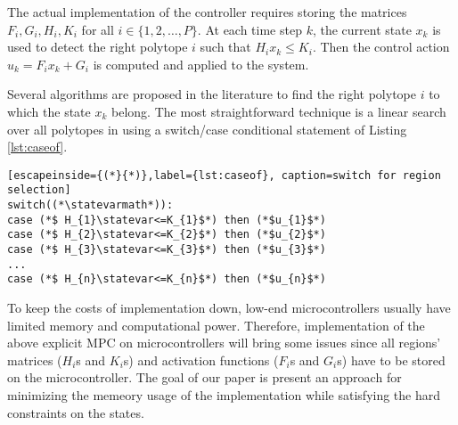 The actual implementation of the controller requires storing the matrices $F_i,G_i,H_i,K_i$ for all $i\in\{1,2,\ldots,P\}$. At each time step $k$, the current state $x_k$ is used to detect the right polytope $i$ such that $H_i x_k\le K_i$. Then the control action $u_k = F_i x_k + G_i$ is computed and applied to the system.

Several algorithms are proposed in the literature \Sadegh{[references?]} to find the right polytope $i$ to which the state $x_k$ belong. The most straightforward technique is a linear search over all polytopes in \Sadegh{\statespace\space} using a switch/case conditional statement of Listing \ref{lst:caseof}.

\begin{lstlisting}[escapeinside={(*}{*)},label={lst:caseof}, caption=switch for region selection]
switch((*\statevarmath*)):
case (*$ H_{1}\statevar<=K_{1}$*) then (*$u_{1}$*)
case (*$ H_{2}\statevar<=K_{2}$*) then (*$u_{2}$*)
case (*$ H_{3}\statevar<=K_{3}$*) then (*$u_{3}$*)
...
case (*$ H_{n}\statevar<=K_{n}$*) then (*$u_{n}$*)
\end{lstlisting}

To keep the costs of implementation down, low-end microcontrollers usually have limited memory and computational power. Therefore, implementation of the above explicit MPC on microcontrollers will bring some issues since all regions' matrices ($H_i$s and $K_i$s) and activation functions ($F_i$s and $G_i$s) have to be stored on the microcontroller. The goal of our paper is present an approach for minimizing the memeory usage of the implementation while satisfying the hard constraints on the states. 
